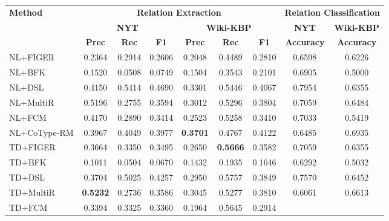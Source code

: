 
\begin{table*}
\begin{center}
\begin{tabular}{  l || c|c|c | c|c|c || c|c}
\hline
\multirow{3}{*}{\textbf{Method}} & \multicolumn{6}{c||}{\textbf{Relation Extraction}} & \multicolumn{2}{c}{\textbf{Relation Classification}} \\
\cline{2-9}
& \multicolumn{3}{c|}{\textbf{NYT}} &  \multicolumn{3}{c||}{\textbf{Wiki-KBP}} & \textbf{NYT} & \textbf{Wiki-KBP}\\
\cline{2-9}
& \textbf{Prec} & \textbf{Rec}  & \textbf{F1}
& \textbf{Prec} & \textbf{Rec} & \textbf{F1}
& \textbf{Accuracy} & \textbf{Accuracy}
\\ \hline
NL+FIGER
& 0.2364 & 0.2914 & 0.2606  
& 0.2048 & 0.4489 & 0.2810 
& 0.6598 & 0.6226 
\\
NL+BFK
& 0.1520 & 0.0508 & 0.0749 
& 0.1504 & 0.3543 & 0.2101 
& 0.6905 & 0.5000   
\\
NL+DSL
& 0.4150 & 0.5414 & 0.4690 
& 0.3301 & 0.5446 & 0.4067 
& 0.7954 & 0.6355   
\\ 
NL+MultiR
& 0.5196 & 0.2755 & 0.3594 
& 0.3012 & 0.5296 & 0.3804 
& 0.7059 & 0.6484 
\\
NL+FCM
& 0.4170 & 0.2890 & 0.3414 
& 0.2523 & 0.5258 & 0.3410 
& 0.7033 & 0.5419 
\\
NL+CoType-RM
& 0.3967 & 0.4049 & 0.3977  
& \textbf{0.3701} & 0.4767 & 0.4122
& 0.6485 & 0.6935
\\
\hline
TD+FIGER
& 0.3664 & 0.3350 & 0.3495 
& 0.2650 & \textbf{0.5666} & 0.3582 
& 0.7059 & 0.6355
\\
TD+BFK
& 0.1011 & 0.0504 & 0.0670 
& 0.1432 & 0.1935 & 0.1646 
& 0.6292 & 0.5032   
\\
TD+DSL
& 0.3704 & 0.5025 & 0.4257 
& 0.2950 & 0.5757 & 0.3849 
& 0.7570 & 0.6452
\\ 
TD+MultiR
& \textbf{0.5232} & 0.2736 & 0.3586 
& 0.3045 & 0.5277 & 0.3810 
& 0.6061 & 0.6613  
\\
TD+FCM
& 0.3394 & 0.3325 & 0.3360 
& 0.1964 & 0.5645 & 0.2914

\end{tabular}
\end{center}
\end{table*}
